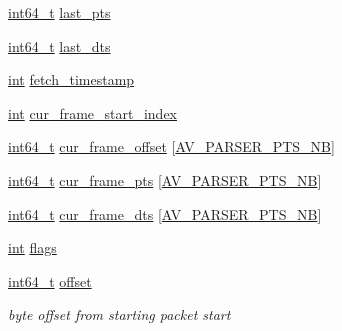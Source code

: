 \begin{DoxyCompactItemize}
\item 
\hyperlink{lib-src_2ffmpeg_2win32_2stdint_8h_a67a9885ef4908cb72ce26d75b694386c}{int64\+\_\+t} \hyperlink{struct_a_v_codec_parser_context_ae89a7517e6ae437a3658424e748ed980}{last\+\_\+pts}
\item 
\hyperlink{lib-src_2ffmpeg_2win32_2stdint_8h_a67a9885ef4908cb72ce26d75b694386c}{int64\+\_\+t} \hyperlink{struct_a_v_codec_parser_context_a6f05a770622ba8c068d37752fec72eca}{last\+\_\+dts}
\item 
\hyperlink{xmltok_8h_a5a0d4a5641ce434f1d23533f2b2e6653}{int} \hyperlink{struct_a_v_codec_parser_context_af4800c3024585bd29852ab15d11588d6}{fetch\+\_\+timestamp}
\item 
\hyperlink{xmltok_8h_a5a0d4a5641ce434f1d23533f2b2e6653}{int} \hyperlink{struct_a_v_codec_parser_context_ac4e6f9c9bd604bd9ff4d7a5035381557}{cur\+\_\+frame\+\_\+start\+\_\+index}
\item 
\hyperlink{lib-src_2ffmpeg_2win32_2stdint_8h_a67a9885ef4908cb72ce26d75b694386c}{int64\+\_\+t} \hyperlink{struct_a_v_codec_parser_context_abe8a632fc75a7b0a614175552b45f85b}{cur\+\_\+frame\+\_\+offset} \mbox{[}\hyperlink{avcodec_8h_ab16338725f6f17d4acce3cc80b210f01}{A\+V\+\_\+\+P\+A\+R\+S\+E\+R\+\_\+\+P\+T\+S\+\_\+\+NB}\mbox{]}
\item 
\hyperlink{lib-src_2ffmpeg_2win32_2stdint_8h_a67a9885ef4908cb72ce26d75b694386c}{int64\+\_\+t} \hyperlink{struct_a_v_codec_parser_context_ab9dc35523fa27b36052b5ab984189ca2}{cur\+\_\+frame\+\_\+pts} \mbox{[}\hyperlink{avcodec_8h_ab16338725f6f17d4acce3cc80b210f01}{A\+V\+\_\+\+P\+A\+R\+S\+E\+R\+\_\+\+P\+T\+S\+\_\+\+NB}\mbox{]}
\item 
\hyperlink{lib-src_2ffmpeg_2win32_2stdint_8h_a67a9885ef4908cb72ce26d75b694386c}{int64\+\_\+t} \hyperlink{struct_a_v_codec_parser_context_a952b4e5e0f5422fb61c8a7bf3dd06afb}{cur\+\_\+frame\+\_\+dts} \mbox{[}\hyperlink{avcodec_8h_ab16338725f6f17d4acce3cc80b210f01}{A\+V\+\_\+\+P\+A\+R\+S\+E\+R\+\_\+\+P\+T\+S\+\_\+\+NB}\mbox{]}
\item 
\hyperlink{xmltok_8h_a5a0d4a5641ce434f1d23533f2b2e6653}{int} \hyperlink{struct_a_v_codec_parser_context_ab6cc0e73ffbec72c438413c6c6a4e326}{flags}
\item 
\hyperlink{lib-src_2ffmpeg_2win32_2stdint_8h_a67a9885ef4908cb72ce26d75b694386c}{int64\+\_\+t} \hyperlink{struct_a_v_codec_parser_context_af22fba8f2937d73db0ab5c9f9e985916}{offset}
\begin{DoxyCompactList}\small\item\em byte offset from starting packet start \end{DoxyCompactList}\item 

\end{DoxyCompactItemize}
